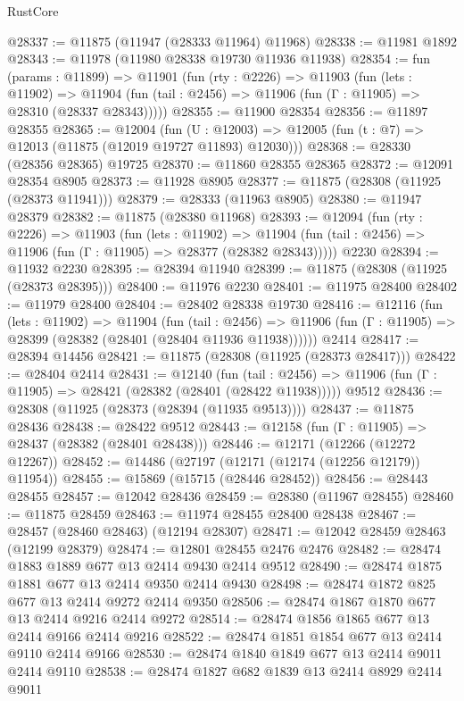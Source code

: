 \begin{lexlean}{RustCore}
\begin{coremodule}
@28337 := @11875 (@11947 (@28333 @11964) @11968)
@28338 := @11981 @1892
@28343 := @11978 (@11980 @28338 @19730 @11936 @11938)
@28354 := fun (params : @11899) =>
  @11901
    (fun (rty : @2226) =>
    @11903
      (fun (lets : @11902) =>
      @11904 (fun (tail : @2456) => @11906 (fun (Γ : @11905) => @28310 (@28337 @28343)))))
@28355 := @11900 @28354
@28356 := @11897 @28355
@28365 := @12004
    (fun (U : @12003) => @12005 (fun (t : @7) => @12013 (@11875 (@12019 @19727 @11893) @12030)))
@28368 := @28330 (@28356 @28365) @19725
@28370 := @11860 @28355 @28365
@28372 := @12091 @28354 @8905
@28373 := @11928 @8905
@28377 := @11875 (@28308 (@11925 (@28373 @11941)))
@28379 := @28333 (@11963 @8905)
@28380 := @11947 @28379
@28382 := @11875 (@28380 @11968)
@28393 := @12094
    (fun (rty : @2226) =>
    @11903
      (fun (lets : @11902) =>
      @11904 (fun (tail : @2456) => @11906 (fun (Γ : @11905) => @28377 (@28382 @28343)))))
    @2230
@28394 := @11932 @2230
@28395 := @28394 @11940
@28399 := @11875 (@28308 (@11925 (@28373 @28395)))
@28400 := @11976 @2230
@28401 := @11975 @28400
@28402 := @11979 @28400
@28404 := @28402 @28338 @19730
@28416 := @12116
    (fun (lets : @11902) =>
    @11904
      (fun (tail : @2456) =>
      @11906 (fun (Γ : @11905) => @28399 (@28382 (@28401 (@28404 @11936 @11938))))))
    @2414
@28417 := @28394 @14456
@28421 := @11875 (@28308 (@11925 (@28373 @28417)))
@28422 := @28404 @2414
@28431 := @12140
    (fun (tail : @2456) => @11906 (fun (Γ : @11905) => @28421 (@28382 (@28401 (@28422 @11938)))))
    @9512
@28436 := @28308 (@11925 (@28373 (@28394 (@11935 @9513))))
@28437 := @11875 @28436
@28438 := @28422 @9512
@28443 := @12158 (fun (Γ : @11905) => @28437 (@28382 (@28401 @28438)))
@28446 := @12171 (@12266 (@12272 @12267))
@28452 := @14486 (@27197 (@12171 (@12174 (@12256 @12179)) @11954))
@28455 := @15869 (@15715 (@28446 @28452))
@28456 := @28443 @28455
@28457 := @12042 @28436
@28459 := @28380 (@11967 @28455)
@28460 := @11875 @28459
@28463 := @11974 @28455 @28400 @28438
@28467 := @28457 (@28460 @28463) (@12194 @28307)
@28471 := @12042 @28459 @28463 (@12199 @28379)
@28474 := @12801 @28455 @2476 @2476
@28482 := @28474 @1883 @1889 @677 @13 @2414 @9430 @2414 @9512
@28490 := @28474 @1875 @1881 @677 @13 @2414 @9350 @2414 @9430
@28498 := @28474 @1872 @825 @677 @13 @2414 @9272 @2414 @9350
@28506 := @28474 @1867 @1870 @677 @13 @2414 @9216 @2414 @9272
@28514 := @28474 @1856 @1865 @677 @13 @2414 @9166 @2414 @9216
@28522 := @28474 @1851 @1854 @677 @13 @2414 @9110 @2414 @9166
@28530 := @28474 @1840 @1849 @677 @13 @2414 @9011 @2414 @9110
@28538 := @28474 @1827 @682 @1839 @13 @2414 @8929 @2414 @9011

\end{coremodule}
\end{lexlean}

